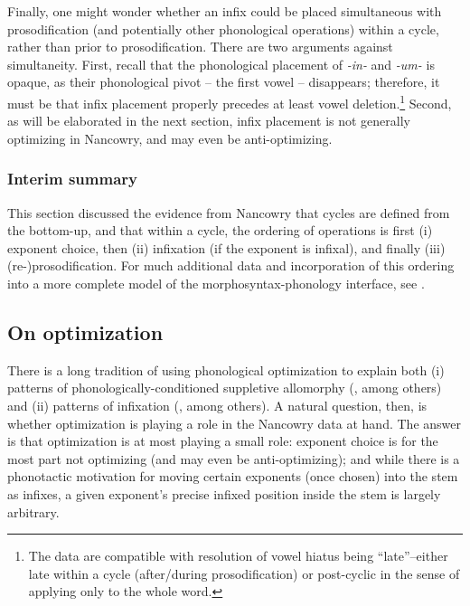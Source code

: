 \documentclass[output=paper]{langscibook}
\begin{document}
Finally, one might wonder whether an infix could be placed simultaneous with prosodification (and potentially other phonological operations) within a cycle, rather than prior to prosodification. There are two arguments against simultaneity. First, recall that the phonological placement of \textit{-in-} and \textit{-um-} is opaque, as their phonological pivot -- the first vowel -- disappears; therefore, it must be that infix placement properly precedes at least vowel deletion.\footnote{The data are compatible with resolution of vowel hiatus being ``late''--either late within a cycle (after/during prosodification) or post-cyclic in the sense of applying only to the whole word.} Second, as will be elaborated in the next section, infix placement is not generally optimizing in Nancowry, and may even be anti-optimizing.

\subsubsection{Interim summary}\label{sec:kalin:4.2.3}

This section discussed the evidence from Nancowry that cycles are defined from the bottom-up, and that within a cycle, the ordering of operations is first (i) exponent choice, then (ii) infixation (if the exponent is infixal), and finally (iii) (re-)prosodification. For much additional data and incorporation of this ordering into a more complete model of the morphosyntax-phonology interface, see \citealt{KalinIP}.

\subsection{On optimization}\label{kalinopt}\label{sec:kalin:4.3}

There is a long tradition of using phonological optimization to explain both (i) patterns of phonologically-conditioned suppletive allomorphy (\citealt{MP93a,Mester94,Kager96,Mascaro96,Mascaro07,Wolf08,Kim10}, among others) and (ii) patterns of infixation (\citealt{MP93a,HI97,Horwood02,Wolf08}, among others). A natural question, then, is whether optimization is playing a role in the Nancowry data at hand. The answer is that optimization is at most playing a small role: exponent choice is for the most part not optimizing (and may even be anti-optimizing); and while there is a phonotactic motivation for moving certain exponents (once chosen) into the stem as infixes, a given exponent's precise infixed position inside the stem is largely arbitrary.
\end{document}
